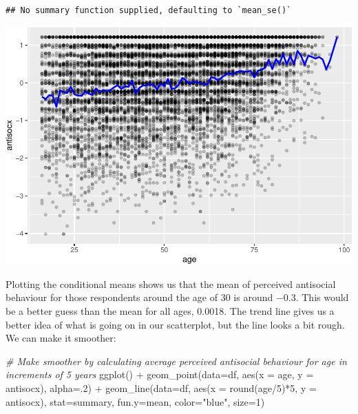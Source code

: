 \documentclass[
]{book}
\newenvironment{Shaded}{\begin{snugshade}}{\end{snugshade}}
\newcommand{\AttributeTok}[1]{\textcolor[rgb]{0.77,0.63,0.00}{#1}}
\newcommand{\CommentTok}[1]{\textcolor[rgb]{0.56,0.35,0.01}{\textit{#1}}}
\newcommand{\DecValTok}[1]{\textcolor[rgb]{0.00,0.00,0.81}{#1}}
\newcommand{\FunctionTok}[1]{\textcolor[rgb]{0.00,0.00,0.00}{#1}}
\newcommand{\NormalTok}[1]{#1}
\newcommand{\SpecialCharTok}[1]{\textcolor[rgb]{0.00,0.00,0.00}{#1}}
\newcommand{\StringTok}[1]{\textcolor[rgb]{0.31,0.60,0.02}{#1}}
\begin{document}
\begin{verbatim}
## No summary function supplied, defaulting to `mean_se()`
\end{verbatim}

\includegraphics{09-regression_files/figure-latex/unnamed-chunk-7-1.pdf}

Plotting the conditional means shows us that the mean of perceived antisocial behaviour for those respondents around the age of 30 is around −0.3. This would be a better guess than the mean for all ages, 0.0018. The trend line gives us a better idea of what is going on in our scatterplot, but the line looks a bit rough. We can make it smoother:

\begin{Shaded}
\begin{Highlighting}[]
\CommentTok{\# Make smoother by calculating average perceived antisocial behaviour for age in increments of 5 years}
\FunctionTok{ggplot}\NormalTok{() }\SpecialCharTok{+} 
  \FunctionTok{geom\_point}\NormalTok{(}\AttributeTok{data=}\NormalTok{df, }\FunctionTok{aes}\NormalTok{(}\AttributeTok{x =}\NormalTok{ age, }\AttributeTok{y =}\NormalTok{ antisocx), }\AttributeTok{alpha=}\NormalTok{.}\DecValTok{2}\NormalTok{) }\SpecialCharTok{+} 
  \FunctionTok{geom\_line}\NormalTok{(}\AttributeTok{data=}\NormalTok{df, }\FunctionTok{aes}\NormalTok{(}\AttributeTok{x =} \FunctionTok{round}\NormalTok{(age}\SpecialCharTok{/}\DecValTok{5}\NormalTok{)}\SpecialCharTok{*}\DecValTok{5}\NormalTok{, }\AttributeTok{y =}\NormalTok{ antisocx), }\AttributeTok{stat=}\StringTok{\textquotesingle{}summary\textquotesingle{}}\NormalTok{, }\AttributeTok{fun.y=}\NormalTok{mean,}
            \AttributeTok{color=}\StringTok{"blue"}\NormalTok{, }\AttributeTok{size=}\DecValTok{1}\NormalTok{)}
\end{Highlighting}
\end{Shaded}
\end{document}
